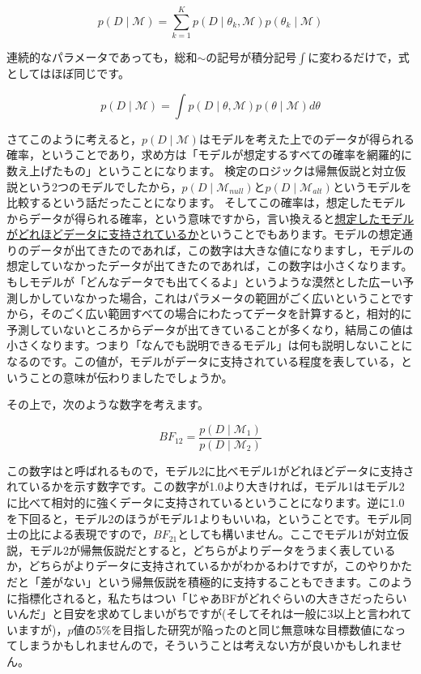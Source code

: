 \documentclass{ltjbook}
\begin{document}
\[ p(D\mid \mathcal{M}) = \sum_{k=1}^K p(D\mid \theta_k,\mathcal{M})p(\theta_k\mid \mathcal{M}) \]

連続的なパラメータであっても，総和$\sim$の記号が積分記号$\int$に変わるだけで，式としてはほぼ同じです。

\[ p(D \mid \mathcal{M}) = \int p(D\mid \theta,\mathcal{M})p(\theta\mid\mathcal{M}) d\theta \]

さてこのように考えると，$p(D \mid \mathcal{M})$はモデルを考えた上でのデータが得られる確率，ということであり，求め方は「モデルが想定するすべての確率を網羅的に数え上げたもの」ということになります。
検定のロジックは帰無仮説と対立仮説という2つのモデルでしたから，$p(D \mid \mathcal{M}_{null})$と$p(D \mid \mathcal{M}_{alt})$というモデルを比較するという話だったことになります。
そしてこの確率は，想定したモデルからデータが得られる確率，という意味ですから，言い換えると\underline{想定したモデルがどれほどデータに支持されているか}ということでもあります。モデルの想定通りのデータが出てきたのであれば，この数字は大きな値になりますし，モデルの想定していなかったデータが出てきたのであれば，この数字は小さくなります。もしモデルが「どんなデータでも出てくるよ」というような漠然とした広ーい予測しかしていなかった場合，これはパラメータの範囲がごく広いということですから，そのごく広い範囲すべての場合にわたってデータを計算すると，相対的に予測していないところからデータが出てきていることが多くなり，結局この値は小さくなります。つまり「なんでも説明できるモデル」は何も説明しないことになるのです。この値が，モデルがデータに支持されている程度を表している，ということの意味が伝わりましたでしょうか。

その上で，次のような数字を考えます。

\[ BF_{12} = \frac{p(D\mid \mathcal{M}_1)}{p(D\mid \mathcal{M}_2)} \]

この数字はと呼ばれるもので，モデル2に比べモデル1がどれほどデータに支持されているかを示す数字です。この数字が1.0より大きければ，モデル1はモデル2に比べて相対的に強くデータに支持されているということになります。逆に1.0を下回ると，モデル2のほうがモデル1よりもいいね，ということです。モデル同士の比による表現ですので，$BF_{21}$としても構いません。ここでモデル1が対立仮説，モデル2が帰無仮説だとすると，どちらがよりデータをうまく表しているか，どちらがよりデータに支持されているかがわかるわけですが，このやりかただと「差がない」という帰無仮説を積極的に支持することもできます。このように指標化されると，私たちはつい「じゃあBFがどれぐらいの大きさだったらいいんだ」と目安を求めてしまいがちですが(そしてそれは一般に3以上と言われていますが)，$p$値の5\%を目指した研究が陥ったのと同じ無意味な目標数値になってしまうかもしれませんので，そういうことは考えない方が良いかもしれません。
\end{document}
